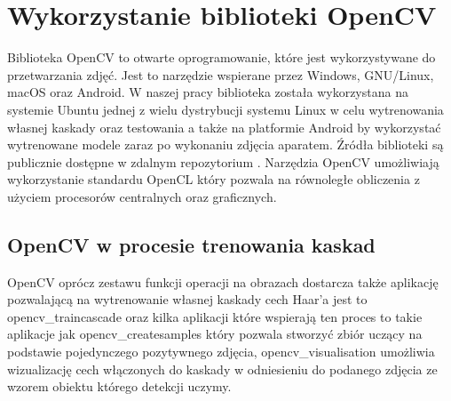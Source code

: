 \section{Wykorzystanie biblioteki OpenCV}\label{sec:opencv}
Biblioteka OpenCV to otwarte oprogramowanie, które jest wykorzystywane do przetwarzania zdjęć. Jest to narzędzie wspierane przez Windows, GNU/Linux, macOS oraz Android. W naszej pracy biblioteka została wykorzystana na systemie Ubuntu jednej z wielu dystrybucji systemu Linux w celu wytrenowania własnej kaskady oraz testowania a także na platformie Android by wykorzystać wytrenowane modele zaraz po wykonaniu zdjęcia aparatem. Źródła biblioteki są publicznie dostępne w zdalnym repozytorium \cite{OpenCVSource}. Narzędzia OpenCV umożliwiają wykorzystanie standardu OpenCL który pozwala na równoległe obliczenia z użyciem procesorów centralnych oraz graficznych.


\subsection{OpenCV w procesie trenowania kaskad}

OpenCV oprócz zestawu funkcji operacji na obrazach dostarcza także aplikację pozwalającą na wytrenowanie własnej kaskady cech Haar’a jest to opencv\_traincascade oraz kilka aplikacji które wspierają ten proces to takie aplikacje jak opencv\_createsamples który pozwala stworzyć zbiór uczący na podstawie pojedynczego pozytywnego zdjęcia, opencv\_visualisation umożliwia wizualizację cech włączonych do kaskady w odniesieniu do podanego zdjęcia ze wzorem obiektu którego detekcji uczymy.

